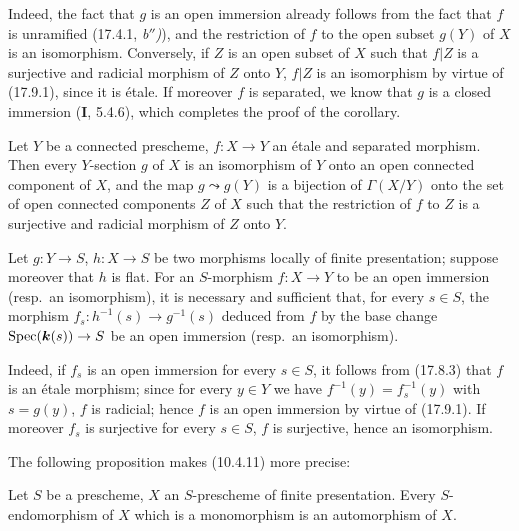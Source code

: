 Indeed, the fact that $g$ is an open immersion already follows from the fact that $f$ is unramified (17.4.1, \emph{b$''$)}), and the restriction of $f$ to the open subset $g(Y)$ of $X$ is an isomorphism. Conversely, if $Z$ is an open subset of $X$ such that $f|Z$ is a surjective and radicial morphism of $Z$ onto $Y$, $f|Z$ is an isomorphism by virtue of (17.9.1), since it is étale. If moreover $f$ is separated, we know that $g$ is a closed immersion (\textbf{I}, 5.4.6), which completes the proof of the corollary.

\begin{corollary}[17.9.4]
\label{IV.17.9.4}
Let $Y$ be a connected prescheme, $f:X\to Y$ an étale and separated morphism. Then every $Y$-section $g$ of $X$ is an isomorphism of $Y$ onto an open connected component of $X$, and the map $g\leadsto g(Y)$ is a bijection of $\Gamma(X/Y)$ onto the set of open connected components $Z$ of $X$ such that the restriction of $f$ to $Z$ is a surjective and radicial morphism of $Z$ onto $Y$.
\end{corollary}

\begin{corollary}[17.9.5]
\label{IV.17.9.5}
Let $g:Y\to S$, $h:X\to S$ be two morphisms locally of finite presentation; suppose moreover that $h$ is \textup{flat}. For an $S$-morphism $f:X\to Y$ to be an open immersion \textup{(resp.}\ an isomorphism\textup{)}, it is necessary and sufficient that, for every $s\in S$, the morphism $f_s:h^{-1}(s)\to g^{-1}(s)$ deduced from $f$ by the base change $\operatorname{Spec}(\boldsymbol{k}(s))\to S$ be an open immersion \textup{(resp.}\ an isomorphism\textup{)}.
\end{corollary}

Indeed, if $f_s$ is an open immersion for every $s\in S$, it follows from (17.8.3) that $f$ is an étale morphism; since for every $y\in Y$ we have $f^{-1}(y)=f_s^{-1}(y)$ with $s=g(y)$, $f$ is radicial; hence $f$ is an open immersion by virtue of (17.9.1). If moreover $f_s$ is surjective for every $s\in S$, $f$ is surjective, hence an isomorphism.

The following proposition makes (10.4.11) more precise:

\begin{proposition}[17.9.6]\label{IV.17.9.6}
Let $S$ be a prescheme, $X$ an $S$-prescheme of finite presentation. Every $S$-endomorphism of $X$ which is a monomorphism is an automorphism of $X$.
\end{proposition}

